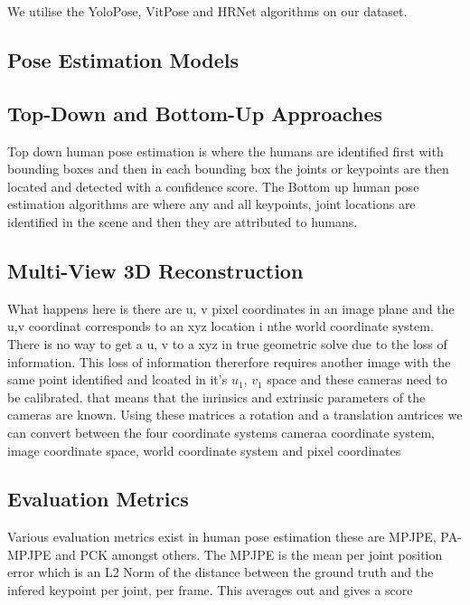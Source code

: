 We utilise the YoloPose, VitPose and HRNet algorithms on our dataset. 


\subsection{Pose Estimation Models}
\subsection{Top-Down and Bottom-Up Approaches}

Top down human pose estimation is where the humans are identified first with bounding boxes and then in each bounding box the joints or keypoints are then located and detected with a confidence score.
The Bottom up human pose estimation algorithms are where any and all keypoints, joint locations are identified in the scene and then they are attributed to humans.

\subsection{Multi-View 3D Reconstruction}

What happens here is there are u, v pixel coordinates in an image plane and the u,v coordinat corresponds to an xyz location i nthe world coordinate system. There is no way to get a u, v to a xyz in true geometric solve due to the loss of information. 
This loss of information thererfore requires another image with the same point identified and lcoated in it's $u_1$, $v_1$ space and these cameras need to be calibrated. that means that the inrinsics and extrinsic parameters of the cameras are known. 
Using these matrices a rotation and a translation amtrices we can convert between the four coordinate systems cameraa coordinate system, image coordinate space, world coordinate system and pixel coordinates 

\subsection{Evaluation Metrics}

Various evaluation metrics exist in human pose estimation these are MPJPE, PA-MPJPE and PCK amongst others. 
The MPJPE is the mean per joint position error which is an L2 Norm of the distance between the ground truth and the infered keypoint per joint, per frame. This averages out and gives a score


